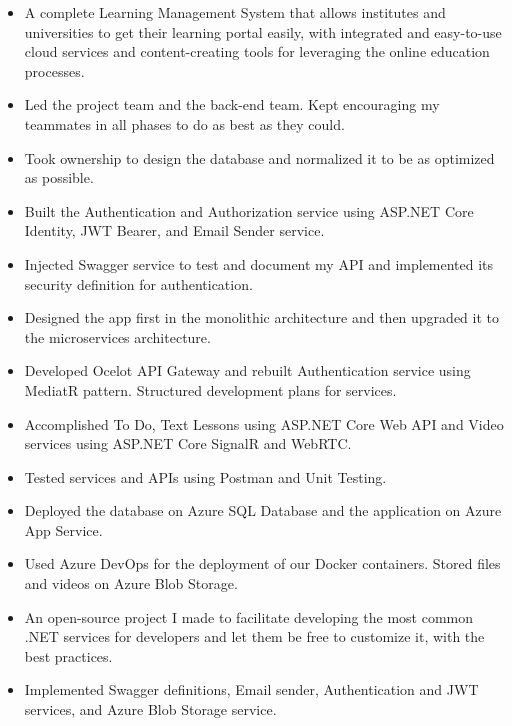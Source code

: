 





\begin{itemize}
    \item A complete Learning Management System that allows institutes and universities to get their learning portal easily, with integrated and easy-to-use cloud services and content-creating tools for leveraging the online education processes.
    \item Led the project team and the back-end team. Kept encouraging my teammates in all phases to do as best as they could.
    \item Took ownership to design the database and normalized it to be as optimized as possible.
    \item Built the Authentication and Authorization service using ASP.NET Core Identity, JWT Bearer, and Email Sender service.
    \item Injected Swagger service to test and document my API and implemented its security definition for authentication.
    \item Designed the app first in the monolithic architecture and then upgraded it to the microservices architecture.
    \item Developed Ocelot API Gateway and rebuilt Authentication service using MediatR pattern. Structured development plans for services.
    \item Accomplished To Do, Text Lessons using ASP.NET Core Web API and Video services using ASP.NET Core SignalR and WebRTC.
    \item Tested services and APIs using Postman and Unit Testing.
    \item Deployed the database on Azure SQL Database and the application on Azure App Service.
    \item Used Azure DevOps for the deployment of our Docker containers. Stored files and videos on Azure Blob Storage.
\end{itemize}

\divider

\begin{itemize}
    \item An open-source project I made to facilitate developing the most common .NET services for developers and let them be free to customize it, with the best practices.
    \item Implemented Swagger definitions, Email sender, Authentication and JWT services, and Azure Blob Storage service.
\end{itemize}

